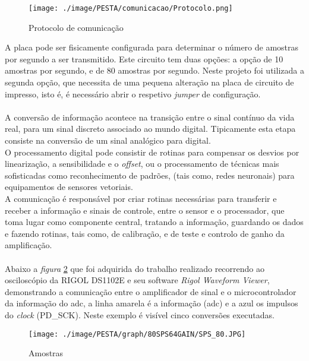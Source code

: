 \begin{figure}[H]
	\centering
	\texttt{[image: ./image/PESTA/comunicacao/Protocolo.png]}
	\caption{Protocolo de comunicação}
	\label{Protocolo}
\end{figure}
A placa 
pode ser fisicamente configurada para determinar o número de amostras por segundo a ser transmitido. Este circuito tem duas opções: a opção de 10 amostras por segundo, e de 80 amostras por segundo. Neste projeto foi utilizada a segunda opção, que necessita de uma pequena alteração na placa de circuito de impresso, isto é, é necessário abrir o respetivo \textit{jumper} de configuração.
\\
\\
A conversão de informação acontece na transição entre o sinal contínuo da vida real, para um sinal discreto associado ao mundo digital. Tipicamente esta etapa consiste na conversão de um sinal analógico para digital.\cite{book-9}
\\
O processamento digital pode consistir de rotinas para compensar os desvios por linearização, a sensibilidade e o \textit{offset}, ou o processamento de técnicas mais sofisticadas como reconhecimento de padrões, (tais como, redes neuronais) para equipamentos de sensores vetoriais.\cite{book-9}
\\
A comunicação é responsável por criar rotinas necessárias para transferir e receber a informação e sinais de controle, entre o sensor e o processador, que toma lugar como componente central, tratando a informação, guardando os dados e fazendo rotinas, tais como, de calibração, e de teste e controlo de ganho da amplificação. \cite{book-9}
\\
\\
Abaixo a \textit{figura} \ref{SPS_64} que foi adquirida do trabalho realizado recorrendo ao osciloscópio da RIGOL DS1102E e seu software \textit{Rigol Waveform Viewer}, demonstrando a comunicação entre o amplificador de sinal e o microcontrolador da informação do \acs{adc}, a linha amarela é a informação (\acs{adc}) e a azul os impulsos do \textit{clock} (PD\_SCK). Neste exemplo é visível cinco conversões executadas.
\\
\begin{figure}[H]
	\centering
	\texttt{[image: ./image/PESTA/graph/80SPS64GAIN/SPS\_80.JPG]}
	\caption{Amostras}
	\label{SPS_64}
\end{figure}
